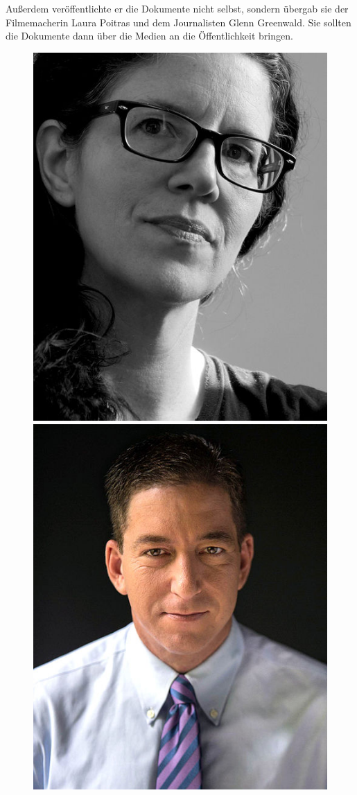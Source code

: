 \documentclass[12pt,a4paper]{scrartcl}
\begin{document}
Außerdem veröffentlichte er die Dokumente nicht selbst, sondern übergab sie der Filmemacherin Laura Poitras und dem Journalisten Glenn Greenwald. Sie sollten die Dokumente dann über die Medien an die Öffentlichkeit bringen.\cite{wiki_snowden}\cite{citizenfour}

\begin{figure}[h]
\centering
\begin{minipage}{0.5\textwidth}
	\centering
	\includegraphics[width=0.7\linewidth]{images/poitras.jpg}
\end{minipage}%
\begin{minipage}{.5\textwidth}
	\centering
	\includegraphics[width=0.7\linewidth]{images/greenwald.jpg}
\end{minipage}
\end{figure}
\end{document}
